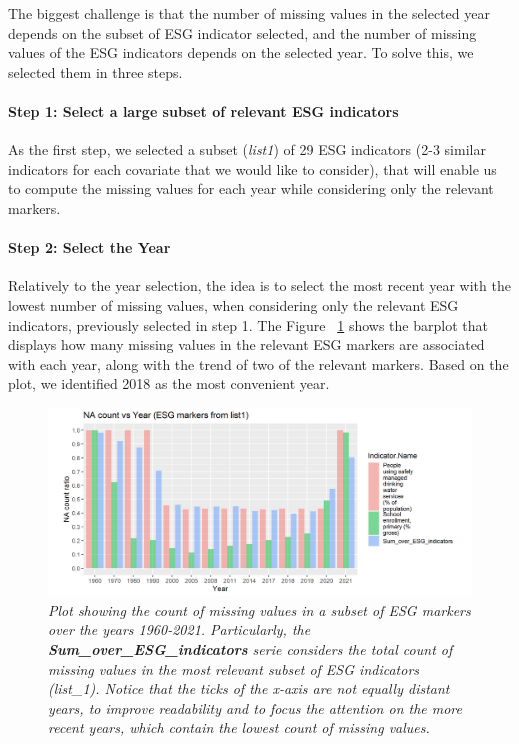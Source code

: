 \documentclass{article}
\begin{document}
	The biggest challenge is that the number of missing values in the selected year depends on the subset of ESG indicator selected, and the number of missing values of the ESG indicators depends on the selected year. To solve this, we selected them in three steps.
	
	\paragraph{Step 1: Select a large subset of relevant ESG indicators}
	As the first step, we selected a subset (\textit{list1}) of 29 ESG indicators (2-3 similar indicators for each covariate that we would like to consider), that will enable us to compute the missing values for each year while considering only the relevant markers.
	
	
	\paragraph{Step 2: Select the Year}
	Relatively to the year selection, the idea is to select the most recent year with the lowest number of missing values, when considering only the relevant ESG indicators, previously selected in step 1.
	The Figure ~\ref{fig:nan_per_year_and_indicator} shows the barplot that displays how many missing values in the relevant ESG markers are associated with each year, along with the trend of two of the relevant markers.
	Based on the plot, we identified 2018 as the most convenient year.
	
	\begin{figure} [th] 
		\centering
		\includegraphics[width=1\linewidth]{nan_per_year_and_indicator.png}
		\caption{\textit{Plot showing the count of missing values in a subset of ESG markers over the years 1960-2021. Particularly, the \textbf{Sum\_over\_ESG\_indicators} serie considers the total count of missing values in the most relevant subset of ESG indicators (list\_1). Notice that the ticks of the x-axis are not equally distant years, to improve readability and to focus the attention on the more recent years, which contain the lowest count of missing values. }}
		\label{fig:nan_per_year_and_indicator}
	\end{figure}
	
\end{document}
